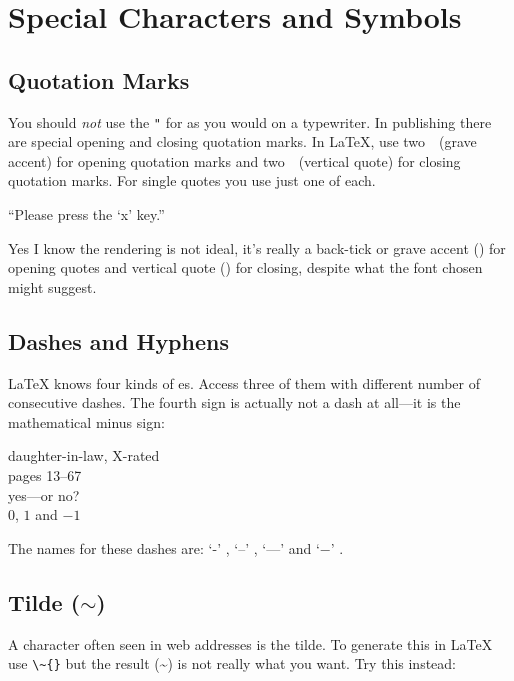 \section{Special Characters and Symbols}
 
\subsection{Quotation Marks}

You should \emph{not} use the \verb|"| for 
 as you would on a typewriter.  In publishing
there are special opening and closing quotation marks.  In \LaTeX{},
use two~\textasciigrave~(grave accent) for opening quotation marks and
two~\textquotesingle~(vertical quote) for closing quotation marks. For single
quotes you use just one of each.
\begin{example}
``Please press the `x' key.''
\end{example}
Yes I know the rendering is not ideal, it's really a back-tick or grave accent
(\textasciigrave) for
opening quotes and vertical quote (\textquotesingle) for closing, despite what the font chosen might suggest.

\subsection{Dashes and Hyphens}

\LaTeX{} knows four kinds of es. Access three of
them with different number of consecutive dashes. The fourth sign
is actually not a dash at all---it is the mathematical minus sign: \index{-}
\index{--} \index{---}  

\begin{example}
daughter-in-law, X-rated\\
pages 13--67\\
yes---or no? \\
$0$, $1$ and $-1$
\end{example}
The names for these dashes are: 
`-' , `--' , `---'  and
`$-$' .

\subsection{Tilde ($\sim$)}
A character often seen in web addresses is the tilde. To generate
this in \LaTeX{} use \verb|\~{}| but the result (\~{}) is not really
what you want. Try this instead:

